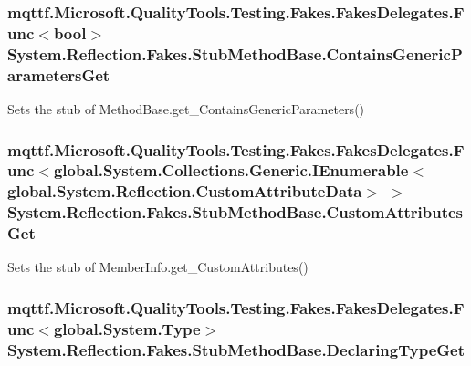 \hypertarget{class_system_1_1_reflection_1_1_fakes_1_1_stub_method_base_a8b8c1a68cb19b20500dcf96b6fbc31e3}{
\subsubsection[{Contains\-Generic\-Parameters\-Get}]{\setlength{\rightskip}{0pt plus 5cm}mqttf.\-Microsoft.\-Quality\-Tools.\-Testing.\-Fakes.\-Fakes\-Delegates.\-Func$<$bool$>$ System.\-Reflection.\-Fakes.\-Stub\-Method\-Base.\-Contains\-Generic\-Parameters\-Get}}\label{class_system_1_1_reflection_1_1_fakes_1_1_stub_method_base_a8b8c1a68cb19b20500dcf96b6fbc31e3}


Sets the stub of Method\-Base.\-get\-\_\-\-Contains\-Generic\-Parameters()

\hypertarget{class_system_1_1_reflection_1_1_fakes_1_1_stub_method_base_aaac10f1ef28e84432a93528c9e14df10}{
\subsubsection[{Custom\-Attributes\-Get}]{\setlength{\rightskip}{0pt plus 5cm}mqttf.\-Microsoft.\-Quality\-Tools.\-Testing.\-Fakes.\-Fakes\-Delegates.\-Func$<$global.\-System.\-Collections.\-Generic.\-I\-Enumerable$<$global.\-System.\-Reflection.\-Custom\-Attribute\-Data$>$ $>$ System.\-Reflection.\-Fakes.\-Stub\-Method\-Base.\-Custom\-Attributes\-Get}}\label{class_system_1_1_reflection_1_1_fakes_1_1_stub_method_base_aaac10f1ef28e84432a93528c9e14df10}


Sets the stub of Member\-Info.\-get\-\_\-\-Custom\-Attributes()

\hypertarget{class_system_1_1_reflection_1_1_fakes_1_1_stub_method_base_a48817cbde98049f88a93732a6ff0a567}{
\subsubsection[{Declaring\-Type\-Get}]{\setlength{\rightskip}{0pt plus 5cm}mqttf.\-Microsoft.\-Quality\-Tools.\-Testing.\-Fakes.\-Fakes\-Delegates.\-Func$<$global.\-System.\-Type$>$ System.\-Reflection.\-Fakes.\-Stub\-Method\-Base.\-Declaring\-Type\-Get}}\label{class_system_1_1_reflection_1_1_fakes_1_1_stub_method_base_a48817cbde98049f88a93732a6ff0a567}


